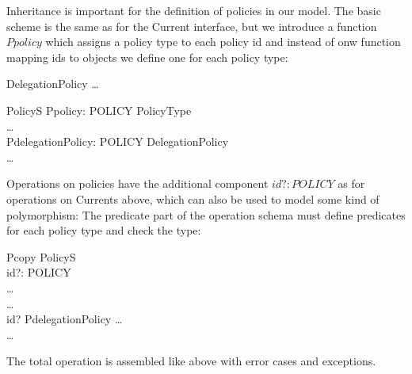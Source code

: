 Inheritance is important for the definition of policies in our model.  The basic
scheme is the same as for the Current interface, but we introduce a function
$Ppolicy$ which assigns a policy type to each policy id and instead of onw
function mapping ids to objects we define one for each policy type:
\begin{zed}
  [POLICY]
\end{zed}
\begin{zedgroup}
  \begin{schema}{DelegationPolicy}
    \dots \\
  \end{schema}
  \begin{schema}{PolicyS}
    Ppolicy: POLICY \pfun PolicyType \\
    \dots \\
    PdelegationPolicy: POLICY \pfun DelegationPolicy \\
    \dots \\
  \end{schema}
\end{zedgroup}

Operations on policies have the additional component $id?: POLICY$ as for
operations on Currents above, which can also be used to model some kind of
polymorphism: The predicate part of the operation schema must define predicates
for each policy type and check the type:
\begin{schema}{Pcopy}
  \Delta PolicyS \\
  id?: POLICY \\
  \dots \\
  \where
  \dots \\
  id? \in \dom PdelegationPolicy \implies \dots \\
  \dots \\
\end{schema}

The total operation is assembled like above with error cases and exceptions.


